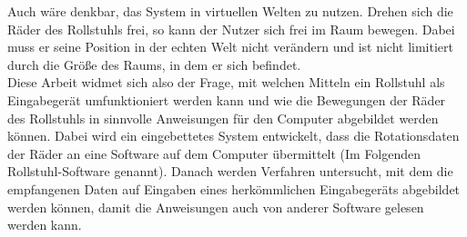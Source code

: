 Auch wäre denkbar, das System in virtuellen Welten zu nutzen.
Drehen sich die Räder des Rollstuhls frei, so kann der Nutzer sich frei im Raum bewegen.
Dabei muss er seine Position in der echten Welt nicht verändern und ist nicht limitiert durch die Größe des Raums, in dem er sich befindet.\\
Diese Arbeit widmet sich also der Frage, mit welchen Mitteln ein Rollstuhl als Eingabegerät umfunktioniert werden kann und wie die Bewegungen der Räder des Rollstuhls in sinnvolle Anweisungen für den Computer abgebildet werden können.
Dabei wird ein eingebettetes System entwickelt, dass die Rotationsdaten der Räder an eine Software auf dem Computer übermittelt (Im Folgenden Rollstuhl-Software genannt).
Danach werden Verfahren untersucht, mit dem die empfangenen Daten auf Eingaben eines herkömmlichen Eingabegeräts abgebildet werden können, damit die Anweisungen auch von anderer Software gelesen werden kann.